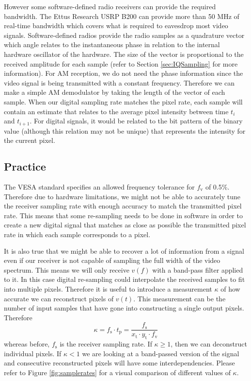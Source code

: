 \documentclass[a4paper,12pt,twoside,openright]{report}
\begin{document}
However some software-defined radio receivers can provide the required bandwidth. The Ettus Research USRP B200 can provide more than 50 MHz of real-time bandwidth which covers what is required to eavesdrop most video signals. Software-defined radios provide the radio samples as a quadrature vector which angle relates to the instantaneous phase in relation to the internal hardware oscillator of the hardware. The size of the vector is proportional to the received amplitude for each sample (refer to Section \ref{sec:IQSampling} for more information). For AM reception, we do not need the phase information since the video signal is being transmitted with a constant frequency. Therefore we can make a simple AM demodulator by taking the length of the vector of each sample. When our digital sampling rate matches the pixel rate, each sample will contain an estimate that relates to the average pixel intensity between time $t_{i}$ and $t_{i+1}$. For digital signals, it would be related to the bit pattern of the binary value (although this relation may not be unique) that represents the intensity for the current pixel.

\subsection{Practice}
The VESA standard specifies an allowed frequency tolerance for $f_\text{v}$ of 0.5\%. Therefore due to hardware limitations, we might not be able to accurately tune the receiver sampling rate with enough accuracy to match the transmitted pixel rate. This means that some re-sampling needs to be done in software in order to create a new digital signal that matches as close as possible the transmitted pixel rate in which each sample corresponds to a pixel.

It is also true that we might be able to recover a lot of information from a signal even if our receiver is not capable of sampling the full width of the video spectrum. This means we will only receive $v(f)$ with a band-pass filter applied to it. In this case digital re-sampling could interpolate the received samples to fit into multiple pixels. Therefore it is useful to introduce a measurement $\kappa$ of how accurate we can reconstruct pixels of $v(t)$. This measurement can be the number of input samples that have gone into constructing a single output pixels. Therefore
\begin{equation}
\label{eq:kappa}
\kappa = f_\text{s} \cdot t_\text{p} = \frac{f_\text{s}}{x_\text{t} \cdot y_\text{t} \cdot f_\text{v}}
\end{equation}
whereas before, $f_\text{s}$ is the receiver sampling rate. If $\kappa \geq 1$, then we can deconstruct individual pixels. If $\kappa < 1$ we are looking at a band-passed version of the signal and consecutive reconstructed pixels will have some interdependencies. Please refer to Figure \ref{fig:samplerates} for a visual comparison of different values of $\kappa$.
\end{document}
